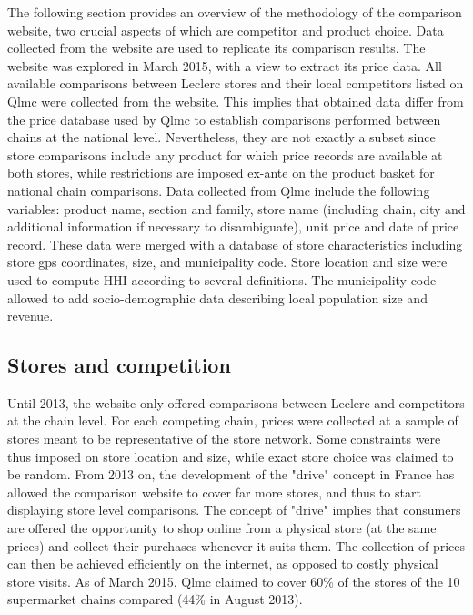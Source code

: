 \documentclass[english]{article}
\begin{document}
 The following section provides an overview of the methodology of the comparison website, two crucial aspects of which are competitor and product choice. Data collected from the website are used to replicate its comparison results. The website was explored in March 2015, with a view to extract its price data. All available comparisons between Leclerc stores and their local competitors listed on Qlmc were collected from the website. This implies that obtained data differ from the price database used by Qlmc to establish comparisons performed between chains at the national level. Nevertheless, they are not exactly a subset since store comparisons include any product for which price records are available at both stores, while restrictions are imposed ex-ante on the product basket for national chain comparisons. Data collected from Qlmc include the following variables: product name, section and family, store name (including chain, city and additional information if necessary to disambiguate), unit price and date of price record. These data were merged with a database of store characteristics including store gps coordinates, size, and municipality code. Store location and size were used to compute HHI according to several definitions. The municipality code allowed to add socio-demographic data describing local population size and revenue.


\subsection{Stores and competition}

Until 2013, the website only offered comparisons between Leclerc and competitors at the chain level. For each competing chain, prices were collected at a sample of stores meant to be representative of the store network. Some constraints were thus imposed on store location and size, while exact store choice was claimed to be random. From 2013 on, the development of the "drive" concept in France has allowed the comparison website to cover far more stores, and thus to start displaying store level comparisons. The concept of "drive" implies that consumers are offered the opportunity to shop online from a physical store (at the same prices) and collect their purchases whenever it suits them. The collection of prices can then be achieved efficiently on the internet, as opposed to costly physical store visits. As of March 2015, Qlmc claimed to cover 60\% of the stores of the 10 supermarket chains compared (44\% in August 2013).
\end{document}
